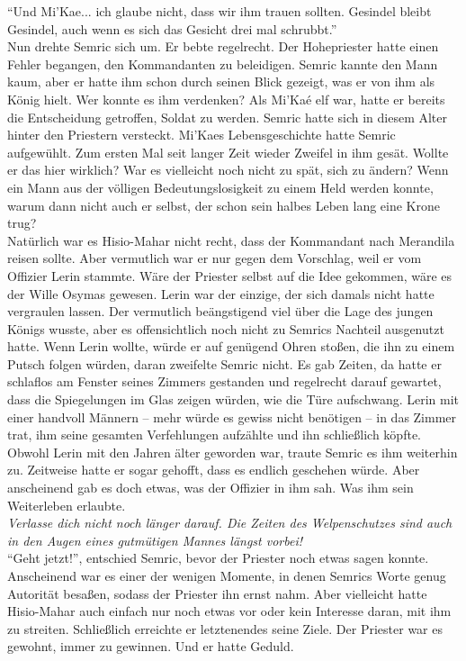 ``Und Mi'Kae... ich glaube nicht, dass wir ihm trauen sollten. Gesindel bleibt Gesindel, auch wenn 
es sich das Gesicht drei mal schrubbt.''\\
Nun drehte Semric sich um. Er bebte regelrecht. Der Hohepriester hatte einen Fehler begangen, den  
Kommandanten zu beleidigen. Semric kannte den Mann kaum, aber er hatte ihm schon durch seinen Blick 
gezeigt, was er von ihm als König hielt. Wer konnte es ihm verdenken? Als Mi'Kaé elf war, hatte er 
bereits die Entscheidung getroffen, Soldat zu werden. Semric hatte sich in diesem Alter hinter den 
Priestern versteckt. Mi'Kaes Lebensgeschichte hatte Semric aufgewühlt. Zum ersten Mal seit langer 
Zeit wieder Zweifel in ihm gesät. Wollte er das hier wirklich? War es vielleicht noch nicht zu 
spät, sich zu ändern? Wenn ein Mann aus der völligen Bedeutungslosigkeit zu einem Held werden 
konnte, warum dann nicht auch er selbst, der schon sein halbes Leben lang eine Krone trug?\\
Natürlich war es Hisio-Mahar nicht recht, dass der Kommandant nach Merandila reisen sollte. Aber 
vermutlich war er nur gegen dem Vorschlag, weil er vom Offizier Lerin stammte. Wäre der Priester 
selbst auf die Idee gekommen, wäre es der Wille Osymas gewesen. Lerin war der einzige, der sich 
damals nicht hatte vergraulen lassen. Der vermutlich beängstigend viel über die Lage des jungen 
Königs wusste, aber es offensichtlich noch nicht zu Semrics Nachteil ausgenutzt hatte. Wenn Lerin 
wollte, würde er auf genügend Ohren stoßen, die ihn zu einem Putsch folgen würden, daran zweifelte 
Semric nicht. Es gab Zeiten, da hatte er schlaflos am Fenster seines Zimmers gestanden und 
regelrecht darauf gewartet, dass die Spiegelungen im Glas zeigen würden, wie die Türe aufschwang. 
Lerin mit einer handvoll Männern – mehr würde es gewiss nicht benötigen – in das Zimmer trat, ihm 
seine gesamten Verfehlungen aufzählte und ihn schließlich köpfte. Obwohl Lerin mit den Jahren älter 
geworden war, traute Semric es ihm weiterhin zu. Zeitweise hatte er sogar gehofft, dass es endlich 
geschehen würde. Aber anscheinend gab es doch etwas, was der Offizier in ihm sah. Was ihm sein 
Weiterleben erlaubte.\\
\textit{Verlasse dich nicht noch länger darauf. Die Zeiten des Welpenschutzes sind auch in den 
Augen eines gutmütigen Mannes längst vorbei!}\\
``Geht jetzt!'', entschied Semric, bevor der Priester noch etwas sagen konnte. \\
Anscheinend war es einer der wenigen Momente, in denen Semrics Worte genug Autorität besaßen, 
sodass der Priester ihn ernst nahm. Aber vielleicht hatte Hisio-Mahar auch einfach nur noch etwas 
vor oder kein Interesse daran, mit ihm zu streiten. Schließlich erreichte er letztenendes seine 
Ziele. Der Priester war es gewohnt, immer zu gewinnen. Und er hatte Geduld. \\



